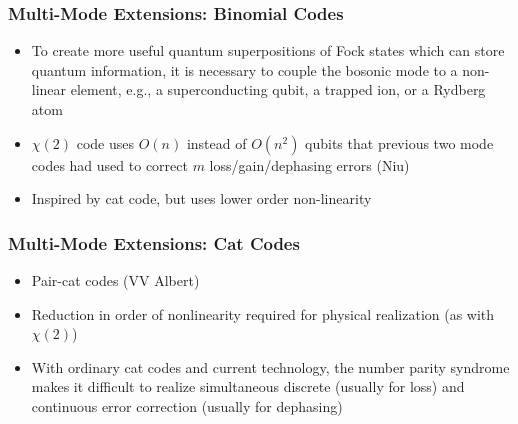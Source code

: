 \documentclass{beamer}
\newcommand\0{\mathbf{0}}
\begin{document}
\begin{frame}
	\frametitle{Multi-Mode Extensions: Binomial Codes}
	\begin{itemize}
	\item To create more useful quantum superpositions of Fock states which can store quantum information, it is necessary to couple the bosonic mode to a non-linear element, e.g., a superconducting qubit, a trapped ion, or a Rydberg atom
		\item $\chi(2)$ code uses $O(n)$ instead of $O(n^2)$ qubits that previous two mode codes had used to correct $m$ loss/gain/dephasing errors (Niu)
		\item Inspired by cat code, but uses lower order non-linearity
	\end{itemize}

	
\end{frame}

\begin{frame}
	\frametitle{Multi-Mode Extensions: Cat Codes}
	\begin{itemize}
		\item Pair-cat codes (VV Albert)
		\item Reduction in order of nonlinearity required for physical realization (as with $\chi(2)$)
		\item With ordinary cat codes and current technology, the number parity syndrome makes it difficult to realize simultaneous discrete (usually for loss) and continuous error correction  (usually for dephasing)
	\end{itemize}

	
\end{frame}
\end{document}
